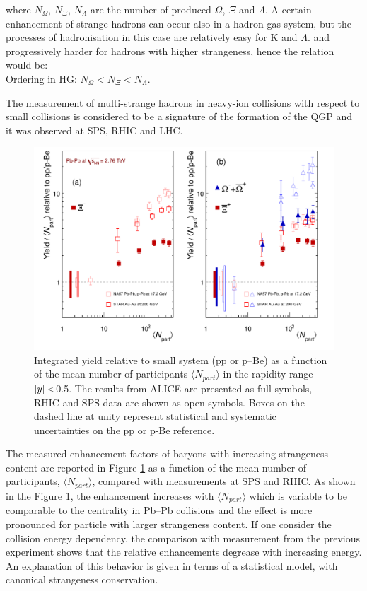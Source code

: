 where $N_{\Omega}$, $N_{\Xi}$, $N_{\Lambda}$ are the number of produced $\Omega$, $\Xi$ and $\Lambda$. A certain enhancement of strange hadrons can occur also in a hadron gas system, but the processes of hadronisation in this case are relatively easy for K and  $\Lambda$. and progressively harder for hadrons with higher strangeness, hence the relation would be: \\
Ordering in HG: $N_{\Omega} <  N_{\Xi} < N_{\Lambda}$.

The measurement of multi-strange hadrons in heavy-ion collisions with respect to small collisions is considered to be a signature of the formation of the QGP and it was observed at SPS, RHIC and LHC. \cite{cite:strangePbPb}


\begin{figure}[htbp]
\begin{center}
\includegraphics[width=12.cm]{./Version1/FigChapter3/MultdNdy}
\caption{Integrated yield relative to small system (pp or p--Be) as a function of the mean number of participants  $\langle N_{part}\rangle$ in the rapidity range $\arrowvert y \arrowvert<$0.5. The results from ALICE are presented as full symbols, RHIC and SPS data are shown as open symbols. Boxes on the dashed line at unity represent statistical and systematic uncertainties on the pp or p-Be reference.}
\label{fig:dNdy}
\end{center}
\end{figure}


The measured enhancement factors of baryons with increasing strangeness content are reported in Figure \ref{fig:dNdy} as a function of the mean number of participants, $\langle N_{part}\rangle$, compared with measurements at SPS and RHIC. 
As shown in the Figure \ref{fig:dNdy}, the enhancement increases with $\langle N_{part}\rangle$ which is variable to be comparable to the centrality in Pb--Pb collisions and the effect is more pronounced for particle with larger strangeness content. If one consider the collision energy dependency, the comparison with measurement from the previous experiment shows that the relative enhancements degrease with increasing energy.  An explanation of this behavior is given in terms of a statistical model, with canonical strangeness conservation. 


